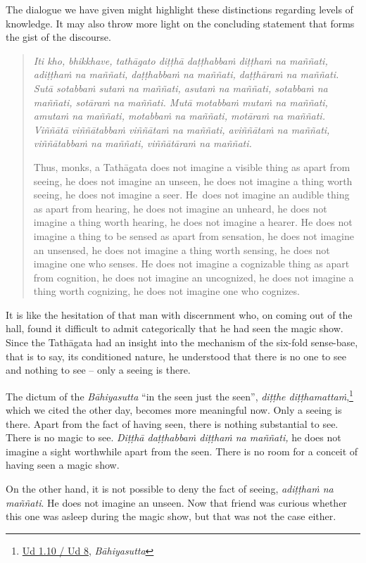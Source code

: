 The dialogue we have given might highlight these distinctions regarding levels of knowledge. It may also throw more light on the concluding statement that forms the gist of the discourse.

\begin{quote}
\emph{Iti kho, bhikkhave, tathāgato diṭṭhā daṭṭhabbaṁ diṭṭhaṁ na maññati, adiṭṭhaṁ na maññati, daṭṭhabbaṁ na maññati, daṭṭhāraṁ na maññati. Sutā sotabbaṁ sutaṁ na maññati, asutaṁ na maññati, sotabbaṁ na maññati, sotāraṁ na maññati. Mutā motabbaṁ mutaṁ na maññati, amutaṁ na maññati, motabbaṁ na maññati, motāraṁ na maññati. Viññātā viññātabbaṁ viññātaṁ na maññati, aviññātaṁ na maññati, viññātabbaṁ na maññati, viññātāraṁ na maññati.}

Thus, monks, a Tathāgata does not imagine a visible thing as apart from seeing, he does not imagine an unseen, he does not imagine a thing worth seeing, he does not imagine a seer. He~does not imagine an audible thing as apart from hearing, he does not imagine an unheard, he does not imagine a thing worth hearing, he does not imagine a hearer. He does not imagine a thing to be sensed as apart from sensation, he does not imagine an unsensed, he does not imagine a thing worth sensing, he does not imagine one who senses. He does not imagine a cognizable thing as apart from cognition, he does not imagine an uncognized, he does not imagine a thing worth cognizing, he does not imagine one who cognizes.
\end{quote}

It is like the hesitation of that man with discernment who, on coming out of the hall, found it difficult to admit categorically that he had seen the magic show. Since the Tathāgata had an insight into the mechanism of the six-fold sense-base, that is to say, its conditioned nature, he understood that there is no one to see and nothing to see -- only a seeing is there.

The dictum of the \emph{Bāhiyasutta} ``in the seen just the seen'', \emph{diṭṭhe diṭṭhamattaṁ},\footnote{\href{https://suttacentral.net/ud1.10/pli/ms}{Ud 1.10 / Ud 8}, \emph{Bāhiyasutta}} which we cited the other day, becomes more meaningful now. Only a seeing is there. Apart from the fact of having seen, there is nothing substantial to see. There is no magic to see. \emph{Diṭṭhā daṭṭhabbaṁ diṭṭhaṁ na maññati,} he does not imagine a sight worthwhile apart from the seen. There is no room for a conceit of having seen a magic show.

On the other hand, it is not possible to deny the fact of seeing, \emph{adiṭṭhaṁ na maññati}. He does not imagine an unseen. Now that friend was curious whether this one was asleep during the magic show, but that was not the case either.

